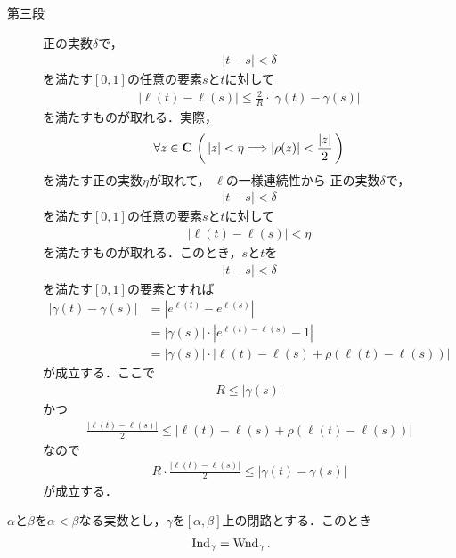 \begin{sketch}
\begin{description}
			\item[第三段]
				正の実数$\delta$で，
				\begin{align}
					|t - s| < \delta
				\end{align}
				を満たす$[0,1]$の任意の要素$s$と$t$に対して
				\begin{align}
					|\ell(t) - \ell(s)| \leq \frac{2}{R} \cdot |\gamma(t) - \gamma(s)|
				\end{align}
				を満たすものが取れる．実際，
				\begin{align}
					\forall z \in \mathbf{C}\,
					\left(\, |z| < \eta \Longrightarrow |\rho(z)| < \frac{|z|}{2}\, \right)
				\end{align}
				を満たす正の実数$\eta$が取れて，
				$\ell$の一様連続性から
				正の実数$\delta$で，
				\begin{align}
					|t - s| < \delta
				\end{align}
				を満たす$[0,1]$の任意の要素$s$と$t$に対して
				\begin{align}
					|\ell(t) - \ell(s)| < \eta
				\end{align}
				を満たすものが取れる．このとき，$s$と$t$を
				\begin{align}
					|t - s| < \delta
				\end{align}
				を満たす$[0,1]$の要素とすれば
				\begin{align}
					|\gamma(t) - \gamma(s)|
					&= \left| e^{\ell(t)} - e^{\ell(s)} \right| \\
					&= |\gamma(s)| \cdot \left| e^{\ell(t) - \ell(s)} - 1 \right| \\
					&= |\gamma(s)| \cdot \left| \ell(t) - \ell(s) + \rho(\ell(t) - \ell(s)) \right|
				\end{align}
				が成立する．ここで
				\begin{align}
					R \leq |\gamma(s)|
				\end{align}
				かつ
				\begin{align}
					\frac{|\ell(t) - \ell(s)|}{2} \leq \left| \ell(t) - \ell(s) + \rho(\ell(t) - \ell(s)) \right|
				\end{align}
				なので
				\begin{align}
					R \cdot \frac{|\ell(t) - \ell(s)|}{2} \leq |\gamma(t) - \gamma(s)|
				\end{align}
				が成立する．
				\QED
		\end{description}
	\end{sketch}
	
	\begin{screen}
		\begin{thm}[閉路の指数と回転数は一致する]
			$\alpha$と$\beta$を$\alpha < \beta$なる実数とし，$\gamma$を$[\alpha,\beta]$上の閉路とする．このとき
			\begin{align}
				\operatorname{Ind}_{\gamma} = \operatorname{Wnd}_{\gamma}.
			\end{align}
		\end{thm}
	\end{screen}
	
